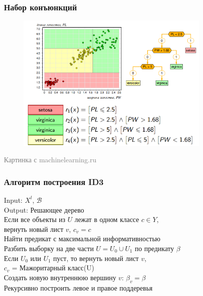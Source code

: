 \documentclass[12pt]{beamer}
\begin{document}
\begin{frame}\frametitle{Набор конъюнкций}
\begin{figure}[htbp]
  \includegraphics[height=190pt, keepaspectratio = true]{images/fisher1}   
\end{figure}
\footnotesize\textcolor{gray} {Картинка с machinelearning.ru}

\end{frame}

\begin{frame}\frametitle{Алгоритм построения ID3}
Input: $X^l$, $\mathcal{B}$\\
Output: Решающее дерево \\
\vspace{3mm}
Если все объекты из $U$ лежат в одном классе $c \in Y$,\\ 
\hspace{10mm} вернуть новый лист $v$, $c_v = c$\\
Найти предикат с максимальной информативностью\\
Разбить выборку на две части $U = U_0 \cup U_1$ по предикату $\beta$\\
Если $U_0$ или $U_1$ пуст, то вернуть новый лист $v$,\\ $c_v$ = Мажоритарный класс(U)\\
Создать новую внутреннюю вершину $v$: $\beta_v = \beta$\\
Рекурсивно построить левое и правое поддеревья
\end{frame}
\end{document}
